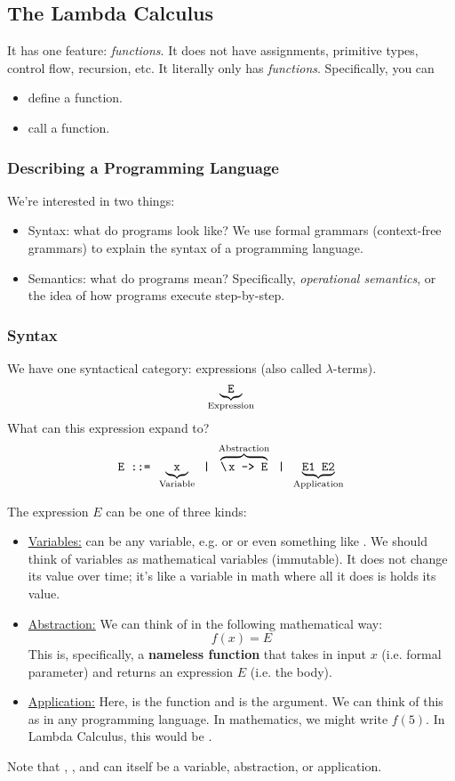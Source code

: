 \documentclass[letterpaper]{article}
\begin{document}
\subsection{The Lambda Calculus}
It has one feature: \emph{functions}. It does not have assignments, primitive types, control flow, recursion, etc. It literally only has \emph{functions}. Specifically, you can
\begin{itemize}
    \item define a function. 
    \item call a function. 
\end{itemize}

\subsubsection{Describing a Programming Language}
We're interested in two things: 
\begin{itemize}
    \item Syntax: what do programs look like? We use formal grammars (context-free grammars) to explain the syntax of a programming language.
    \item Semantics: what do programs mean? Specifically, \emph{operational semantics}, or the idea of how programs execute step-by-step. 
\end{itemize}

\subsubsection{Syntax}
We have one syntactical category: expressions (also called $\lambda$-terms).
\[\underbrace{\texttt{E}}_{\text{Expression}}\]
What can this expression expand to? 
\[\code{E ::= } \underbrace{\code{x}}_{\text{Variable}} \code{ | } \overbrace{\code{\bsttt{x} -> E}}^{\text{Abstraction}} \code{ | } \underbrace{\code{E1 E2}}_{\text{Application}}\]

The expression $E$ can be one of three kinds: 
\begin{itemize}
    \item \underline{Variables:}  can be any variable, e.g.  or  or even something like . We should think of variables as mathematical variables (immutable). It does not change its value over time; it's like a variable in math where all it does is holds its value. 
    
    \item \underline{Abstraction:} We can think of  in the following mathematical way: 
    \[f(x) = E\]
    This is, specifically, a \textbf{nameless function} that takes in input $x$ (i.e. formal parameter) and returns an expression $E$ (i.e. the body).
    
    \item \underline{Application:} Here,  is the function and  is the argument. We can think of this as  in any programming language. In mathematics, we might write $f(5)$. In Lambda Calculus, this would be . 
\end{itemize}
Note that , , and  can itself be a variable, abstraction, or application. 
\end{document}
